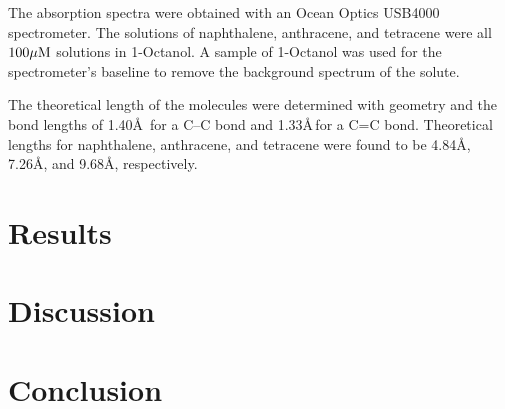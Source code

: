 \documentclass[10pt,a4paper]{article}
\begin{document}
The absorption spectra were obtained with an Ocean Optics USB4000 spectrometer. The solutions of naphthalene, anthracene, and tetracene were all $100 \mu \rm{M}$ solutions in 1-Octanol. A sample of 1-Octanol was used for the spectrometer's baseline to remove the background spectrum of the solute.

The theoretical length of the molecules were determined with geometry and the bond lengths of 1.40\AA\, for a C--C bond and 1.33\AA \,for a C=C bond. Theoretical lengths for naphthalene, anthracene, and tetracene were found to be 4.84\AA, 7.26\AA, and 9.68\AA, respectively.

\section*{Results}

\section*{Discussion}

\section*{Conclusion}
\end{document}
